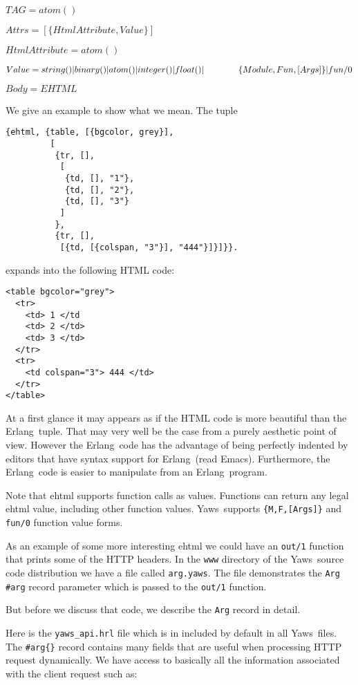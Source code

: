 \documentclass[11pt,oneside,english]{book}
\newcommand{\Erlang}            %
        {{\sc Erlang}}
\newcommand{\Yaws}            %
        {{\sc Yaws}}
\begin{document}
$TAG   = atom()$

$Attrs = [\{HtmlAttribute, Value\}]$

$HtmlAttribute = atom()$

$Value = string() | binary() | atom() | integer() | float() |\\*
\hspace*{0.55 in} \{Module, Fun, [Args]\} | fun/0$

$Body  = EHTML$

We give an example to show what we mean. The tuple

\begin{verbatim}
{ehtml, {table, [{bgcolor, grey}],
         [
          {tr, [],
           [
            {td, [], "1"},
            {td, [], "2"},
            {td, [], "3"}
           ]
          },
          {tr, [],
           [{td, [{colspan, "3"}], "444"}]}]}}.
\end{verbatim}

expands into the following HTML code:

\begin{verbatim}
<table bgcolor="grey">
  <tr>
    <td> 1 </td
    <td> 2 </td>
    <td> 3 </td>
  </tr>
  <tr>
    <td colspan="3"> 444 </td>
  </tr>
</table>

\end{verbatim}

At a first glance it may appears as if the HTML code is more beautiful
than the \Erlang\ tuple. That may very well be the case from a purely
aesthetic point of view. However the \Erlang\ code has the advantage
of being perfectly indented by editors that have syntax support for
\Erlang\ (read Emacs). Furthermore, the \Erlang\ code is easier to
manipulate from an \Erlang\ program.

Note that ehtml supports function calls as values. Functions can
return any legal ehtml value, including other function
values. \Yaws\ supports \verb+{M,F,[Args]}+ and \verb+fun/0+ function
value forms.

As an example of some more interesting ehtml we could have an
\verb+out/1+ function that prints some of the HTTP headers.  In the
\verb+www+ directory of the \Yaws\ source code distribution we have a
file called \verb+arg.yaws+. The file demonstrates the \verb+Arg+
\verb+#arg+ record parameter which is passed to the \verb+out/1+
function.

But before we discuss that code, we describe the \verb+Arg+ record
in detail.

Here is the \verb+yaws_api.hrl+ file which is in included by default
in all \Yaws\ files. The \verb+#arg{}+ record contains many fields
that are useful when processing HTTP request dynamically.  We have
access to basically all the information associated with the client
request such as:
\end{document}
